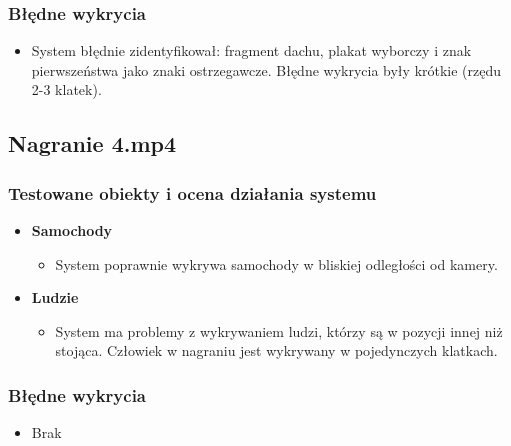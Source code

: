 \subsubsection*{Błędne wykrycia}
\begin{itemize}
    \item System błędnie zidentyfikował: fragment dachu, plakat wyborczy i znak pierwszeństwa jako znaki ostrzegawcze. Błędne wykrycia były krótkie (rzędu 2-3 klatek).
\end{itemize}

\subsection{Nagranie 4.mp4}
\subsubsection*{Testowane obiekty i ocena działania systemu}
\begin{itemize}
    \item \textbf{Samochody}
          \begin{itemize}
              \item System poprawnie wykrywa samochody w bliskiej odległości od kamery.
          \end{itemize}
    \item \textbf{Ludzie}
          \begin{itemize}
              \item System ma problemy z wykrywaniem ludzi, którzy są w pozycji innej niż stojąca. Człowiek w nagraniu jest wykrywany w pojedynczych klatkach.
          \end{itemize}
\end{itemize}

\subsubsection*{Błędne wykrycia}
\begin{itemize}
    \item Brak
\end{itemize}